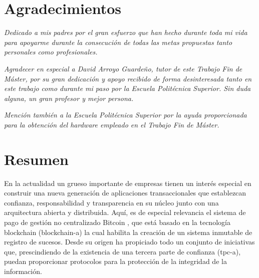 \documentclass[12pt,a4paper, twoside]{report}
\newcommand{\blankpage}{
				\newpage
				\thispagestyle{empty}
				\mbox{}
				\newpage
				}
\begin{document}
	\chapter*{Agradecimientos}
	\thispagestyle{empty}
	\vspace{1cm}
	\begin{flushright}
			\textit{Dedicado a mis padres por el gran esfuerzo que han hecho durante toda mi vida para apoyarme durante la consecución de todas las metas propuestas tanto personales como profesionales.} 
			
		\vspace{1cm}	
		
			\textit{Agradecer en especial a David Arroyo Guardeño, tutor de este Trabajo Fin de Máster, por su gran dedicación y apoyo recibido de forma desinteresada tanto en este trabajo como durante mi paso por la Escuela Politécnica Superior. Sin duda alguna, un gran profesor y mejor persona.}
			
		\vspace{1cm}	
		
		\textit{Mención también a la Escuela Politécnica Superior por la ayuda proporcionada para la obtención del hardware empleado en el Trabajo Fin de Máster.}
	\end{flushright}
	
	\blankpage
	
	\chapter*{Resumen}
	\thispagestyle{empty}
	
	\vspace{-0.3cm}
	
	En la actualidad un grueso importante de empresas tienen un interés especial en construir una nueva generación de aplicaciones transaccionales que establezcan confianza, responsabilidad y transparencia en su núcleo junto con una arquitectura abierta y distribuida. Aquí, es de especial relevancia el sistema de pago de gestión no centralizado Bitcoin \cite{franco:2014:UB}, que está basado en la tecnología \Gls{blockchain} (\gls{blockchain-a}) \cite{iansiti:2017:ttab} la cual habilita la creación de un sistema inmutable de registro de sucesos. Desde su origen ha propiciado todo un conjunto de iniciativas que, prescindiendo de la existencia de una tercera parte de confianza (\gls{tpc-a}), puedan proporcionar protocolos para la protección de la integridad de la información. \\
	
\end{document}
